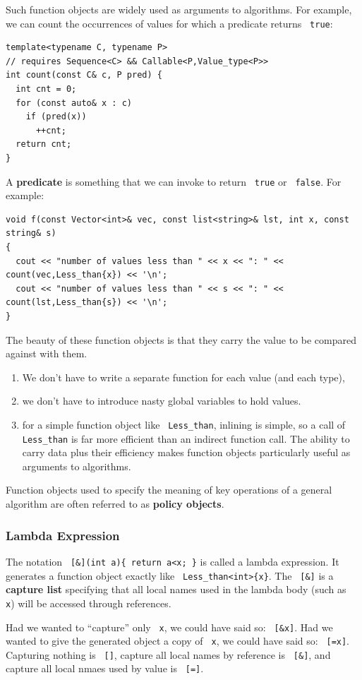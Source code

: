 \documentclass[11pt]{article}
\let\OldTexttt\texttt
\renewcommand{\texttt}[1]{\OldTexttt{\color{MidnightBlue} #1}}
\begin{document}
Such function objects are widely used as arguments to algorithms. For example, we can count the
occurrences of values for which a predicate returns \texttt{true}:
\begin{verbatim}
template<typename C, typename P>
// requires Sequence<C> && Callable<P,Value_type<P>>
int count(const C& c, P pred) {
  int cnt = 0;
  for (const auto& x : c)
    if (pred(x))
      ++cnt;
  return cnt;
}
\end{verbatim}

A \textbf{predicate} is something that we can invoke to return \texttt{true} or \texttt{false}. For example:
\begin{verbatim}
void f(const Vector<int>& vec, const list<string>& lst, int x, const string& s)
{
  cout << "number of values less than " << x << ": " << count(vec,Less_than{x}) << '\n';
  cout << "number of values less than " << s << ": " << count(lst,Less_than{s}) << '\n';
}
\end{verbatim}

The beauty of these function objects is that they carry the value to be compared against with
them.
\begin{enumerate}
\item We don't have to write a separate function for each value (and each type),
\item we don’t have to introduce nasty global variables to hold values.
\item for a simple function object like \texttt{Less\_than}, inlining is simple, so a call of \texttt{Less\_than} is
far more efficient than an indirect function call. The ability to carry data plus their
efficiency makes function objects particularly useful as arguments to algorithms.
\end{enumerate}

Function objects used to specify the meaning of key operations of a general algorithm are often
referred to as \textbf{policy objects}.
\subsubsection{Lambda Expression}
\label{sec:org4137ad9}
The notation \texttt{[\&](int a)\{ return a<x; \}} is called a lambda expression. It generates a function
object exactly like \texttt{Less\_than<int>\{x\}}. The \texttt{[\&]} is a \textbf{capture list} specifying that all local names
used in the lambda body (such as \texttt{x}) will be accessed through references.

Had we wanted to ``capture'' only \texttt{x}, we could have said so: \texttt{[\&x]}. Had we wanted to give the
generated object a copy of \texttt{x}, we could have said so: \texttt{[=x]}. Capturing nothing is \texttt{[]}, capture all
local names by reference is \texttt{[\&]}, and capture all local nmaes used by value is \texttt{[=]}.
\end{document}
